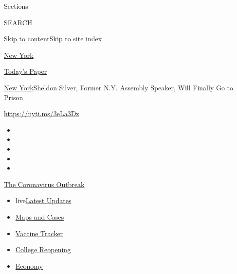 Sections

SEARCH

\protect\hyperlink{site-content}{Skip to
content}\protect\hyperlink{site-index}{Skip to site index}

\href{https://www.nytimes3xbfgragh.onion/section/nyregion}{New York}

\href{https://myaccount.nytimes3xbfgragh.onion/auth/login?response_type=cookie\&client_id=vi}{}

\href{https://www.nytimes3xbfgragh.onion/section/todayspaper}{Today's
Paper}

\href{/section/nyregion}{New York}\textbar{}Sheldon Silver, Former N.Y.
Assembly Speaker, Will Finally Go to Prison

\url{https://nyti.ms/3eLa3Dz}

\begin{itemize}
\item
\item
\item
\item
\item
\end{itemize}

\href{https://www.nytimes3xbfgragh.onion/news-event/coronavirus?action=click\&pgtype=Article\&state=default\&region=TOP_BANNER\&context=storylines_menu}{The
Coronavirus Outbreak}

\begin{itemize}
\tightlist
\item
  live\href{https://www.nytimes3xbfgragh.onion/2020/08/04/world/coronavirus-covid-19.html?action=click\&pgtype=Article\&state=default\&region=TOP_BANNER\&context=storylines_menu}{Latest
  Updates}
\item
  \href{https://www.nytimes3xbfgragh.onion/interactive/2020/us/coronavirus-us-cases.html?action=click\&pgtype=Article\&state=default\&region=TOP_BANNER\&context=storylines_menu}{Maps
  and Cases}
\item
  \href{https://www.nytimes3xbfgragh.onion/interactive/2020/science/coronavirus-vaccine-tracker.html?action=click\&pgtype=Article\&state=default\&region=TOP_BANNER\&context=storylines_menu}{Vaccine
  Tracker}
\item
  \href{https://www.nytimes3xbfgragh.onion/2020/08/02/us/covid-college-reopening.html?action=click\&pgtype=Article\&state=default\&region=TOP_BANNER\&context=storylines_menu}{College
  Reopening}
\item
  \href{https://www.nytimes3xbfgragh.onion/live/2020/08/03/business/stock-market-today-coronavirus?action=click\&pgtype=Article\&state=default\&region=TOP_BANNER\&context=storylines_menu}{Economy}
\end{itemize}

